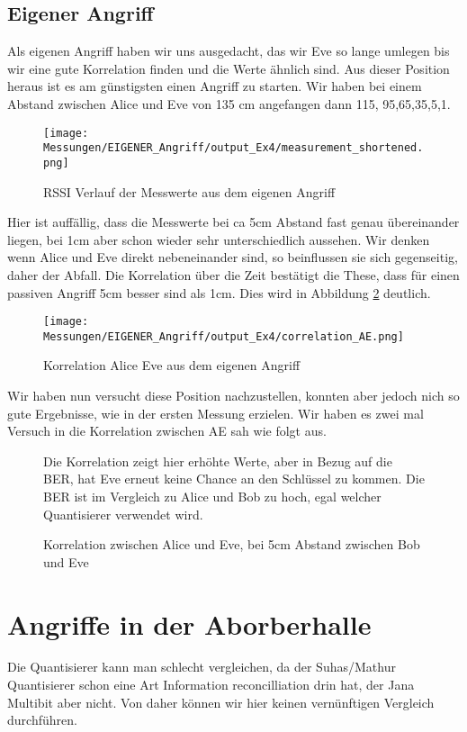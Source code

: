 \documentclass[12pt,a4paper]{article}
\begin{document}
\subsection*{Eigener Angriff}
Als eigenen Angriff haben wir uns ausgedacht, das wir Eve so lange umlegen bis wir eine gute Korrelation finden und die Werte ähnlich sind. Aus dieser Position heraus ist es am günstigsten einen Angriff zu starten. Wir haben bei einem Abstand zwischen Alice und Eve von 135 cm angefangen dann 115, 95,65,35,5,1. 
\begin{figure}[H]
\centering
\texttt{[image: Messungen/EIGENER\_Angriff/output\_Ex4/measurement\_shortened.png]}
\caption{RSSI Verlauf der Messwerte aus dem eigenen Angriff}
\label{fig:e1}
\end{figure}
Hier ist auffällig, dass die Messwerte bei ca 5cm Abstand fast genau übereinander liegen, bei 1cm aber schon wieder sehr unterschiedlich aussehen. Wir denken wenn Alice und Eve direkt nebeneinander sind, so beinflussen sie sich gegenseitig, daher der Abfall.
Die Korrelation über die Zeit bestätigt die These, dass für einen passiven Angriff 5cm besser sind als 1cm. Dies wird in Abbildung \ref{fig:e2} deutlich.
\begin{figure}[H]
\centering
\texttt{[image: Messungen/EIGENER\_Angriff/output\_Ex4/correlation\_AE.png]}
\caption{Korrelation Alice Eve aus dem eigenen Angriff}
\label{fig:e2}
\end{figure}
Wir haben nun versucht diese Position nachzustellen, konnten aber jedoch nich so gute Ergebnisse, wie in der ersten Messung erzielen. Wir haben es zwei mal Versuch in die Korrelation zwischen AE sah wie folgt aus.
\begin{figure}[H]
\centering
{} \qquad
{}
\caption{Korrelation zwischen Alice und Eve, bei 5cm Abstand zwischen Bob und Eve}
\label{fig:p4}
Die Korrelation zeigt hier erhöhte Werte, aber in Bezug auf die BER, hat Eve erneut keine Chance an den Schlüssel zu kommen. Die BER ist im Vergleich zu Alice und Bob zu hoch, egal welcher Quantisierer verwendet wird.
\end{figure}
\section{Angriffe in der Aborberhalle}
Die Quantisierer kann man schlecht vergleichen, da der Suhas/Mathur Quantisierer schon eine Art Information reconcilliation drin hat, der Jana Multibit aber nicht. Von daher können wir hier keinen vernünftigen Vergleich durchführen.
\end{document}
